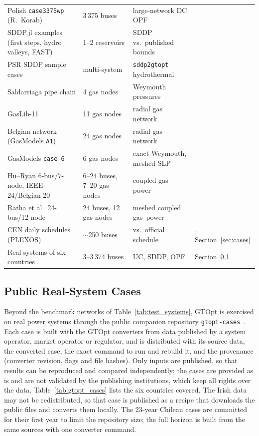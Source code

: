 \begin{table}[t]
\begin{tabular}{@{}llll@{}}
    Polish \texttt{case3375wp} (R.~Korab) & 3\,375 buses & large-network DC OPF & \cite{zimmerman2011matpower} \\
    SDDP.jl examples (first steps, hydro valleys, FAST) & 1--2 reservoirs & SDDP vs.\ published bounds & \cite{dowson2020sddp_jl, cambier_fast} \\
    PSR SDDP sample cases & multi-system & \texttt{sddp2gtopt} hydrothermal & \cite{psrclasses} \\
    Saldarriaga pipe chain & 4 gas nodes & Weymouth pressures & \cite{saldarriaga2018phd} \\
    GasLib-11 & 11 gas nodes & radial gas network & \cite{schmidt2017gaslib, pfetsch2015nominations} \\
    Belgian network (GasModels \texttt{A1}) & 24 gas nodes & radial gas network & \cite{dewolf2000gas, gasmodels} \\
    GasModels \texttt{case-6} & 6 gas nodes & exact Weymouth, meshed SLP & \cite{gasmodels} \\
    Hu--Ryan 6-bus/7-node, IEEE-24/Belgian-20 & 6--24 buses, 7--20 gas nodes & coupled gas--power & \cite{hu2019data, hu2019stochastic} \\
    Ratha et al.\ 24-bus/12-node & 24 buses, 12 gas nodes & meshed coupled gas--power & \cite{ratha2020data, ratha2020affine, ordoudis2019gas} \\
    CEN daily schedules (PLEXOS) & $\sim$250 buses & vs.\ official schedule & \cite{cen_pcp}, Section~\ref{sec:cases} \\
    Real systems of six countries & 3--3\,374 buses & UC, SDDP, OPF & Section~\ref{sec:gtopt_cases} \\
    \bottomrule
  \end{tabular}
\end{table}

\subsection{Public Real-System Cases}
\label{sec:gtopt_cases}

Beyond the benchmark networks of Table~\ref{tab:test_systems}, GTOpt
is exercised on real power systems through the public companion
repository \texttt{gtopt-cases}~\cite{gtoptcases2026}.  Each case is
built with the GTOpt converters from data published by a system
operator, market operator or regulator, and is distributed with its
source data, the converted case, the exact command to run and rebuild
it, and the provenance (converter revision, flags and file hashes).
Only inputs are published, so that results can be reproduced and
compared independently; the cases are provided as is and are not
validated by the publishing institutions, which keep all rights over
the data.  Table~\ref{tab:gtopt_cases} lists the six countries
covered.  The Irish data may not be redistributed, so that case is
published as a recipe that downloads the public files and converts
them locally.  The 23-year Chilean cases are committed for their first
year to limit the repository size; the full horizon is built from the
same sources with one converter command.

